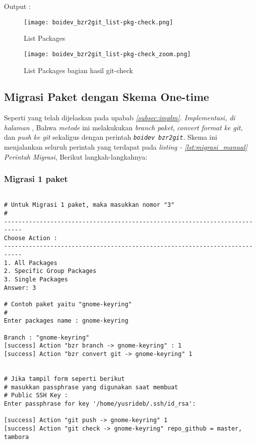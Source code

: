 {\noindent
Output :

\begin{figure}[H]
	\centering
	\texttt{[image: boidev\_bzr2git\_list-pkg-check.png]}
	\caption{List Packages}
	\label{fig:bab2_list_pkg_check}
\end{figure}

\begin{figure}[H]
	\centering
	\texttt{[image: boidev\_bzr2git\_list-pkg-check\_zoom.png]}
	\caption{List Packages bagian hasil git-check}
	\label{fig:bab2_list_pkg_check_zoom}
\end{figure}

\subsection{Migrasi Paket dengan \textbf{Skema One-time}}
\label{implm_5}
\noindent 
Seperti yang telah dijelaskan pada upabab \textit{\ref{subsec:implm}. Implementasi, di halaman \pageref{itm:metode_one-time}}, Bahwa \textit{metode} ini melakukukan \textit{branch paket}, \textit{convert format ke git}, dan \textit{push ke git} sekaligus dengan perintah {\small \textit{\texttt{boidev bzr2git}}}. Skema ini menjalankan seluruh perintah yang terdapat pada \textit{listing - \ref{lst:migrasi_manual} Perintah Migrasi}, Berikut langkah-langkahnya:

\subsubsection{Migrasi 1 paket}

\begin{lstlisting}[language=ShellBash2]

# Untuk Migrasi 1 paket, maka masukkan nomor "3"
#
---------------------------------------------------------------------------
Choose Action : 
---------------------------------------------------------------------------
1. All Packages
2. Specific Group Packages
3. Single Packages
Answer: 3

# Contoh paket yaitu "gnome-keyring"
# 
Enter packages name : gnome-keyring

Branch : "gnome-keyring"
[success] Action "bzr branch -> gnome-keyring" : 1
[success] Action "bzr convert git -> gnome-keyring" 1 


# Jika tampil form seperti berikut
# masukkan passphrase yang digunakan saat membuat
# Public SSH Key :
Enter passphrase for key '/home/yusrideb/.ssh/id_rsa': 

[success] Action "git push -> gnome-keyring" 1
[success] Action "git check -> gnome-keyring" repo_github = master, tambora


\end{lstlisting}}
